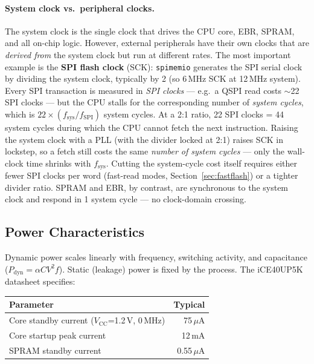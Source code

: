 \documentclass[9pt, a4paper]{extarticle}
\begin{document}
\paragraph{System clock vs.\ peripheral clocks.} The system clock is the single clock that drives the CPU core, EBR, SPRAM, and all on-chip logic. However, external peripherals have their own clocks that are \emph{derived from} the system clock but run at different rates. The most important example is the \textbf{SPI flash clock} (SCK): \texttt{spimemio} generates the SPI serial clock by dividing the system clock, typically by 2 (so 6\,MHz SCK at 12\,MHz system). Every SPI transaction is measured in \emph{SPI clocks} --- e.g.\ a QSPI read costs $\sim$22 SPI clocks --- but the CPU stalls for the corresponding number of \emph{system cycles}, which is $22 \times (f_{\text{sys}} / f_{\text{SPI}})$ system cycles. At a 2:1 ratio, 22 SPI clocks = 44 system cycles during which the CPU cannot fetch the next instruction. Raising the system clock with a PLL (with the divider locked at 2:1) raises SCK in lockstep, so a fetch still costs the same \emph{number of system cycles} --- only the wall-clock time shrinks with $f_{\text{sys}}$. Cutting the system-cycle cost itself requires either fewer SPI clocks per word (fast-read modes, Section~\ref{sec:fastflash}) or a tighter divider ratio. SPRAM and EBR, by contrast, are synchronous to the system clock and respond in 1 system cycle --- no clock-domain crossing.

\subsection{Power Characteristics}

Dynamic power scales linearly with frequency, switching activity, and capacitance ($P_{\text{dyn}} = \alpha C V^2 f$). Static (leakage) power is fixed by the process. The iCE40UP5K datasheet specifies:

\begin{center}\small
\begin{tabular}{@{}l r@{}}
    \toprule
    Parameter & Typical \\
    \midrule
    Core standby current ($V_{\text{CC}}$=1.2\,V, 0\,MHz) & 75\,$\mu$A \\
    Core startup peak current & 12\,mA \\
    SPRAM standby current & 0.55\,$\mu$A \\
    \bottomrule
\end{tabular}
\end{center}
\end{document}
